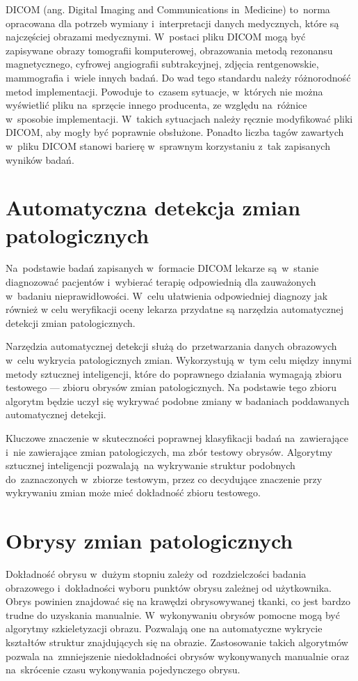\documentclass[a4paper,11pt,twoside,openright]{report}
\theoremstyle{definition}
\begin{document}
DICOM (ang. Digital Imaging and Communications in~Medicine) \cite{DICOM} to~norma
opracowana dla potrzeb wymiany i~interpretacji danych medycznych, które są
najczęściej obrazami medycznymi. W~postaci pliku DICOM mogą być zapisywane obrazy
tomografii komputerowej, obrazowania metodą rezonansu magnetycznego, cyfrowej
angiografii subtrakcyjnej, zdjęcia rentgenowskie, mammografia i~wiele innych badań.
Do wad tego standardu należy różnorodność metod implementacji. Powoduje to~czasem
sytuacje, w~których nie można wyświetlić pliku na~sprzęcie innego producenta, ze
względu na~różnice w~sposobie implementacji. W~takich sytuacjach należy ręcznie
modyfikować pliki DICOM, aby mogły być poprawnie obsłużone. Ponadto liczba tagów zawartych w~pliku
DICOM stanowi barierę w~sprawnym korzystaniu z~tak zapisanych wyników badań.

\section {Automatyczna detekcja zmian patologicznych}

Na~podstawie badań zapisanych w~formacie DICOM lekarze są~w~stanie diagnozować
pacjentów i~wybierać terapię odpowiednią dla zauważonych w~badaniu nieprawidłowości.
W~celu ułatwienia odpowiedniej diagnozy jak również w celu weryfikacji oceny lekarza
przydatne są narzędzia automatycznej detekcji zmian patologicznych.

Narzędzia automatycznej detekcji służą do~przetwarzania danych obrazowych w~celu
wykrycia patologicznych zmian. Wykorzystują w~tym celu między innymi metody sztucznej
inteligencji, które do poprawnego działania wymagają zbioru testowego --- zbioru
obrysów zmian patologicznych. Na podstawie tego zbioru algorytm będzie uczył się
wykrywać podobne zmiany w badaniach poddawanych automatycznej detekcji.

Kluczowe znaczenie w skuteczności poprawnej klasyfikacji badań na~zawierające i~nie
zawierające zmian patologiczych, ma zbór testowy obrysów. Algorytmy sztucznej inteligencji
pozwalają na wykrywanie struktur podobnych do~zaznaczonych w~zbiorze testowym,
przez co decydujące znaczenie przy wykrywaniu zmian może mieć dokładność zbioru testowego.

\section {Obrysy zmian patologicznych}

Dokładność obrysu w~dużym stopniu zależy od~rozdzielczości badania obrazowego i~dokładności
wyboru punktów obrysu zależnej od użytkownika. Obrys powinien znajdować się na krawędzi
obrysowywanej tkanki, co jest bardzo trudne do uzyskania manualnie. W~wykonywaniu
obrysów pomocne mogą być algorytmy szkieletyzacji obrazu. Pozwalają one na automatyczne
wykrycie kształtów struktur znajdujących się na obrazie. Zastosowanie takich algorytmów
pozwala na~zmniejszenie niedokładności obrysów wykonywanych manualnie oraz na~skrócenie
czasu wykonywania pojedynczego obrysu.
\end{document}
